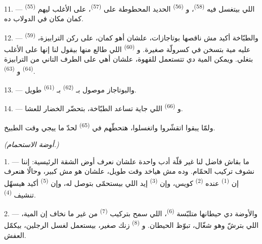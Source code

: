 \VUsaut{4.0mm}
\VUsaut{3.0mm}

11. ---  \textsuperscript{(55)} اللي بيتغسل فيه
 \textsuperscript{(58)}، و \textsuperscript{(56)} الحديد
المحطوطة على  \textsuperscript{(57)}، على الأغلب ليهم كمان مكان في
الدولاب ده.

12. --- والطبّاخة أكيد مش ناقصها بوتاجازات، علشان أهو كمان، على ركن
الترابيزة،  \textsuperscript{(59)} عليه مية بتسخن في كسرولّة
صغيرة. و \textsuperscript{(60)} اللي طالع منها بيقول لنا إنها على
الأغلب بتغلي. ويمكن المية دي تتستعمل للقهوة، علشان أهي على الطرف التاني من
الترابيزة  \textsuperscript{(64)} و
\textsuperscript{(63)}.

13. --- والبوتاجاز موصول بـ \textsuperscript{(62)}
بـ \textsuperscript{(61)} طويل.

14. --- و \textsuperscript{(66)} اللي جاية تساعد الطبّاخة،
بتحضّر الخضار للعشا.

ولمّا يبقوا اتقشّروا واتغسلوا، هتحطّهم في  \textsuperscript{(65)}
لحدّ ما ييجي وقت الطبيخ.

\VUsaut{4.0mm}
{\centering\fontsize{10.2pt}{10.2pt}\selectfont{} \textit{(أوضة الاستحمام.)}\par}
\VUsaut{3.0mm}

1. --- ما بقاش فاضل لنا غير قلّة أدب واحدة علشان نعرف أوض الشقة الرئيسية:
إننا نشوف تركيب الحمّام. وده مش هياخد وقت طويل، علشان هو مش كبير، وحالًا
هنعرف إن  \textsuperscript{(1)} عنده  \textsuperscript{(2)}
كويس، وإن  \textsuperscript{(3)} إيد اللي بيستحمّى بتوصل له، وإن
 \textsuperscript{(5)} أكيد هيسهّل تنشيف 
\textsuperscript{(4)}.

2. --- والأوضة دي حيطانها متلبّسة  \textsuperscript{(6)}، اللي سمح
بتركيب  \textsuperscript{(7)} من غير ما نخاف إن المية، اللي بترشّ وهو
شغّال، تبوّظ الحيطان. و \textsuperscript{(8)} زنك صغير، بيستعمل لغسل
الرجلين، بيكمّل العفش.

\VUsaut{6.0mm}
\VUfilet{22mm}

